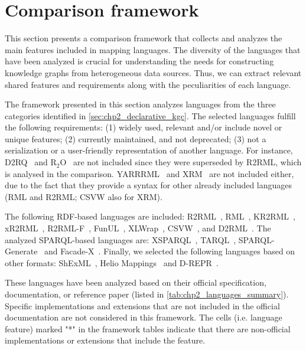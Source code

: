 \section{Comparison framework}
\label{sec:chp4_framework}


This section presents a comparison framework that collects and analyzes the main features included in mapping languages. The diversity of the languages that have been analyzed is crucial for understanding the needs for constructing knowledge graphs from heterogeneous data sources. Thus, we can extract relevant shared features and requirements along with the peculiarities of each language. 


The framework presented in this section analyzes languages from the three categories identified in \cref{sec:chp2_declarative_kgc}. The selected languages fulfill the following requirements: (1) widely used, relevant and/or include novel or unique features; (2) currently maintained, and not deprecated; (3) not a serialization or a user-friendly representation of another language. For instance, D2RQ~\parencite{bizer2004d2rq} and R$_2$O~\parencite{barrasa2004r2o} are not included since they were superseded by R2RML, which is analysed in the comparison. YARRRML~\parencite{Heyvaert2018yarrrml} and XRM~\parencite{xrm} are not included either, due to the fact that they provide a syntax for other already included languages (RML and R2RML; CSVW also for XRM).


The following RDF-based languages are included: R2RML~\parencite{das2012r2rml}, RML~\parencite{Dimou2014rml}, KR2RML~\parencite{slepicka2015kr2rml}, xR2RML~\parencite{michel2015xr2rml}, R2RML-F~\parencite{debruyne2016r2rmlf}, FunUL~\parencite{junior2016funul},  XLWrap~\parencite{langegger2009xlwrap}, CSVW~\parencite{Tennison2015csvw}, and D2\-RML~\parencite{chortaras2018d2rml}. The analyzed SPARQL-based languages are: XSPARQL~\parencite{Bischof2012xsparql}, TARQL~\parencite{tarql},  SPARQL-Gene\-rate~\parencite{Lefrancois2017sparqlgenerate} and Facade-X~\parencite{daga2021facade}. Finally, we selected the following languages based on other formats: ShExML~\parencite{Garcia-Gonzalez2020shexml}, Helio Mappings~\parencite{cimmino2022helio} and D-REPR~\parencite{Vu2019d-repr}.  

These languages have been analyzed based on their official specification, documentation, or reference paper (listed in \cref{tab:chp2_languages_summary}). Specific implementations and extensions that are not included in the official documentation are not considered in this framework. The cells (i.e. language feature) marked "*"  in the framework tables indicate that there are non-official implementations or extensions that include the feature.

